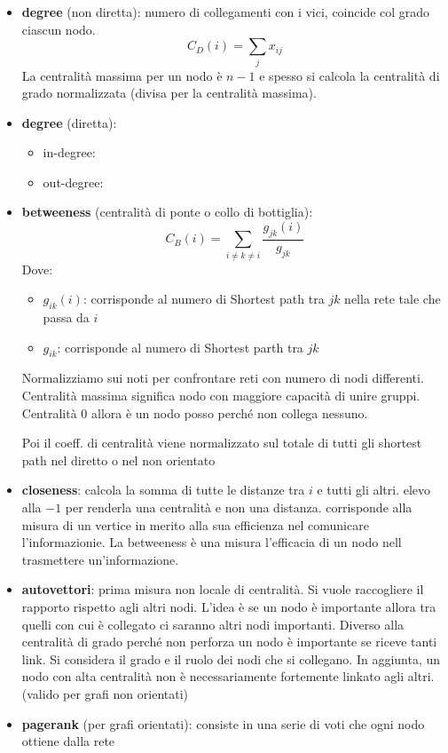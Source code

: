 \begin{itemize}
    \item \textbf{degree} (non diretta): numero di collegamenti con i vici, coincide col grado
    ciascun nodo.
    $$C_D(i) = \sum_j x_{ij}$$
    La centralità massima per un nodo è $n-1$ e spesso si calcola la centralità di 
    grado normalizzata (divisa per la centralità massima).
    \item \textbf{degree} (diretta):
    \begin{itemize}
        \item in-degree:
        \item out-degree:
    \end{itemize}
    \item \textbf{betweeness} (centralità di ponte o collo di bottiglia): 
    $$C_B(i) = \sum_{i\ne k \ne i} \frac{g_{jk}(i)}{g_{jk}}$$
    Dove:
    \begin{itemize}
        \item $g_{ik}(i)$: corrisponde al numero di Shortest path tra $jk$ nella rete tale che 
        passa da $i$
        \item $g_{ik}$: corrisponde al numero di Shortest parth tra $jk$
    \end{itemize}
    Normalizziamo sui noti per confrontare reti con numero di nodi differenti.
    Centralità massima significa nodo con maggiore capacità di unire gruppi. Centralità $0$
    allora è un nodo posso perché non collega nessuno.
    
    Poi il coeff. di centralità viene normalizzato sul totale di tutti gli shortest 
    path nel diretto o nel non orientato
    \item \textbf{closeness}: calcola la somma di tutte le distanze tra $i$ e tutti gli altri.
    elevo alla $-1$ per renderla una centralità e non una distanza. corrisponde 
    alla misura di un vertice in merito alla sua efficienza nel comunicare l'informazionie.
    La betweeness è una misura l'efficacia di un nodo nell trasmettere un'informazione.
    \item \textbf{autovettori}: prima misura non locale di centralità. Si vuole 
    raccogliere il rapporto rispetto agli altri nodi. L'idea è se un nodo è
    importante allora tra quelli con cui è collegato ci saranno altri nodi importanti.
    Diverso alla centralità di grado perché non perforza un nodo è importante se 
    riceve tanti link. Si considera il grado e il ruolo dei nodi che si collegano.
    In aggiunta, un nodo con alta centralità non è necessariamente fortemente linkato
    agli altri. (valido per grafi non orientati)
    \item \textbf{pagerank} (per grafi orientati): consiste in una serie di voti
    che ogni nodo ottiene dalla rete


\end{itemize}
